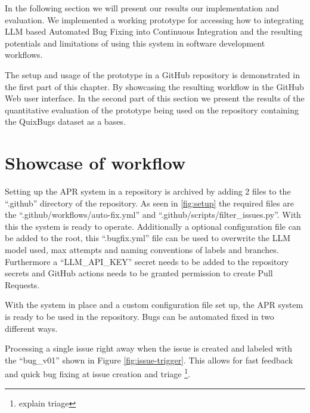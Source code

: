 In the following section we will present our results our implementation and evaluation. We implemented a working prototype for accessing how to integrating LLM based Automated Bug Fixing into Continuous Integration and the resulting potentials and limitations of using this system in software development workflows.

The setup and usage of the prototype in a GitHub repository is demonstrated in the first part of this chapter. By showcasing the resulting workflow in the GitHub Web user interface. In the second part of this section we  present the results of the quantitative evaluation of the prototype being used on the repository containing the QuixBugs dataset as a bases.

\section{Showcase of workflow} \label{section:showcase}
Setting up the APR system in a repository is archived by adding 2 files to the ``.github'' directory of the repository. As seen in \ref{fig:setup} the required files are the ``.github/workflows/auto-fix.yml'' and ``.github/scripts/filter\_issues.py''. With this the system is ready to operate. Additionally a optional configuration file can be added to the root, this ``.bugfix.yml'' file can be used to overwrite the LLM model used, max attempts and naming conventions of labels and branches. Furthermore a ``LLM\_API\_KEY'' secret needs to be added to the repository secrets and GitHub actions needs to be granted permission to create Pull Requests.


With the system in place and a custom configuration file set up, the APR system is ready to be used in the repository. Bugs can be automated fixed in two different ways.

Processing a single issue right away when the issue is created and labeled with the ``bug\_v01'' shown in Figure \ref{fig:issue-trigger}. This allows for fast feedback and quick bug fixing at issue creation and triage \footnote{explain triage}.

